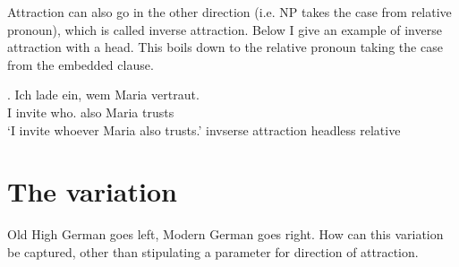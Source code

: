Attraction can also go in the other direction (i.e. NP takes the case from relative pronoun), which is called inverse attraction. Below I give an example of inverse attraction with a head. This boils down to the relative pronoun taking the case from the embedded clause.

\exg. Ich {lade ein}, wem Maria vertraut. \\
I invite who. also Maria trusts\\
`I invite whoever Maria also trusts.' \hfill invserse attraction headless relative


\section{The variation}

Old High German goes left, Modern German goes right. How can this variation be captured, other than stipulating a parameter for direction of attraction.
